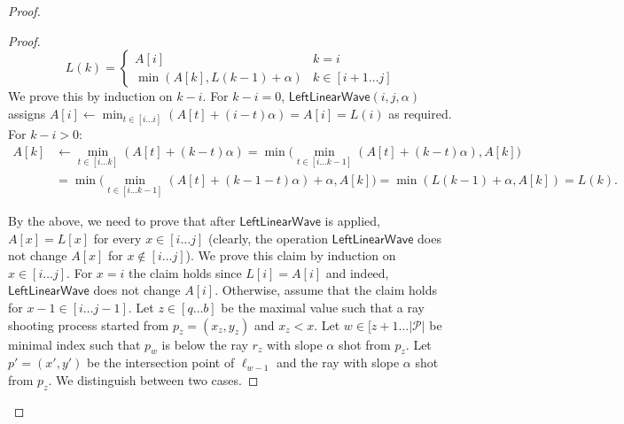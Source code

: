 \documentclass[a4paper,UKenglish,cleveref, autoref, thm-restate]{lipics-v2021}
\newcommand{\LLW}{\mathsf{LeftLinearWave}}
\renewcommand{\P}{\mathcal{P}}
\newcommand{\ray}{r}
\begin{document}
\begin{proof}
\begin{proof}
$$L(k) = \begin{cases}
A[i] & k=i
\\
\min(A[k], L(k-1) + \alpha) & k \in [i+1 \ldots j]
\end{cases}
$$
We prove this by induction on $k-i$.
For $k-i = 0$, $\LLW(i,j,\alpha)$ assigns $A[i] \leftarrow \min_{t\in [i\ldots i]}(A[t] + (i-t) \alpha) = A[i] = L(i)$ as required.
For $k - i > 0$:
\begin{align*}
A[k] & \leftarrow \min_{t\in [i\ldots k]}(A[t] + (k-t) \alpha) = \min\big( \min_{t\in [i\ldots k-1]}(A[t] + (k-t) \alpha) , A[k] \big) \\
&=   \min\big( \min_{t\in [i\ldots k-1]}(A[t] + (k- 1 - t) \alpha) + \alpha , A[k] \big) = \min(L(k-1) + \alpha , A[k] ) = L(k). 
\end{align*}

By the above, we need to prove that after $\LLW$ is applied, $A[x] = L[x]$ for every $x\in[i\ldots j]$ (clearly, the operation $\LLW$ does not change $A[x]$ for $x\notin [i\ldots j]$).
We prove this claim by induction on $x \in [i \ldots j]$. 
For $x=i$ the claim holds since $L[i]=A[i]$ and indeed, $\LLW$ does not change $A[i]$. 
Otherwise, assume that the claim holds for $x-1 \in [i\ldots j-1]$.
Let $z\in[q\ldots b]$ be the maximal value such that a ray shooting process started from $p_z = (x_z,y_z)$ and $x_z < x$. 
Let $w\in [z+1\ldots |\P|$ be minimal index such that $p_w$ is below the ray $\ray_z$ with slope $\alpha$ shot from $p_z$. Let $p'=(x',y')$ be the intersection point of $\ell_{w-1}$ and the ray with slope $\alpha$ shot from $p_z$.
We distinguish between two cases.


\end{proof}
\end{proof}
\end{document}
